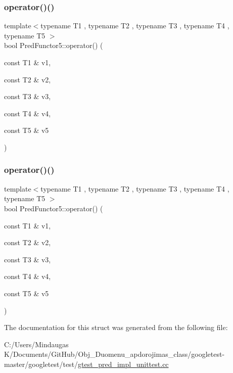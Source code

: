 \mbox{\label{struct_pred_functor5_af9decf4d509848479ccdc4fe90129a06}} 
\subsubsection{\texorpdfstring{operator()()}{operator()()}\hspace{0.1cm}{\footnotesize\ttfamily [2/3]}}
{\footnotesize\ttfamily template$<$typename T1 , typename T2 , typename T3 , typename T4 , typename T5 $>$ \\
bool Pred\+Functor5\+::operator() (\begin{DoxyParamCaption}\item[{const T1 \&}]{v1,  }\item[{const T2 \&}]{v2,  }\item[{const T3 \&}]{v3,  }\item[{const T4 \&}]{v4,  }\item[{const T5 \&}]{v5 }\end{DoxyParamCaption})\hspace{0.3cm}{\ttfamily [inline]}}

\mbox{\label{struct_pred_functor5_af9decf4d509848479ccdc4fe90129a06}} 
\subsubsection{\texorpdfstring{operator()()}{operator()()}\hspace{0.1cm}{\footnotesize\ttfamily [3/3]}}
{\footnotesize\ttfamily template$<$typename T1 , typename T2 , typename T3 , typename T4 , typename T5 $>$ \\
bool Pred\+Functor5\+::operator() (\begin{DoxyParamCaption}\item[{const T1 \&}]{v1,  }\item[{const T2 \&}]{v2,  }\item[{const T3 \&}]{v3,  }\item[{const T4 \&}]{v4,  }\item[{const T5 \&}]{v5 }\end{DoxyParamCaption})\hspace{0.3cm}{\ttfamily [inline]}}



The documentation for this struct was generated from the following file\+:\begin{DoxyCompactItemize}
\item 
C\+:/\+Users/\+Mindaugas K/\+Documents/\+Git\+Hub/\+Obj\+\_\+\+Duomenu\+\_\+apdorojimas\+\_\+class/googletest-\/master/googletest/test/\mbox{\hyperlink{googletest-master_2googletest_2test_2gtest__pred__impl__unittest_8cc}{gtest\+\_\+pred\+\_\+impl\+\_\+unittest.\+cc}}\end{DoxyCompactItemize}
